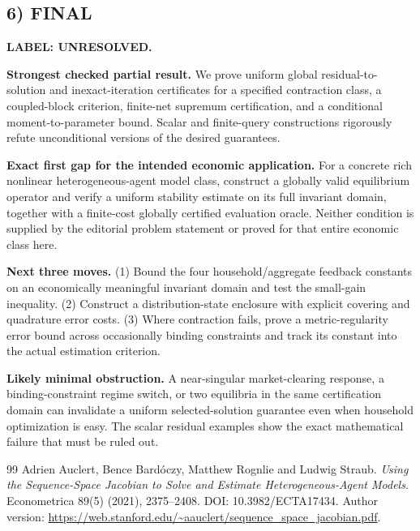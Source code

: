 \documentclass[11pt,a4paper]{article}
\theoremstyle{definition}
\newcommand{\unresolved}{\textbf{LABEL: UNRESOLVED.}}
\begin{document}
\subsection*{6) FINAL}
\unresolved

\textbf{Strongest checked partial result.} We prove uniform global residual-to-solution and inexact-iteration certificates for a specified contraction class, a coupled-block criterion, finite-net supremum certification, and a conditional moment-to-parameter bound. Scalar and finite-query constructions rigorously refute unconditional versions of the desired guarantees.

\textbf{Exact first gap for the intended economic application.} For a concrete rich nonlinear heterogeneous-agent model class, construct a globally valid equilibrium operator and verify a uniform stability estimate on its full invariant domain, together with a finite-cost globally certified evaluation oracle. Neither condition is supplied by the editorial problem statement or proved for that entire economic class here.

\textbf{Next three moves.} (1) Bound the four household/aggregate feedback constants on an economically meaningful invariant domain and test the small-gain inequality. (2) Construct a distribution-state enclosure with explicit covering and quadrature error costs. (3) Where contraction fails, prove a metric-regularity error bound across occasionally binding constraints and track its constant into the actual estimation criterion.

\textbf{Likely minimal obstruction.} A near-singular market-clearing response, a binding-constraint regime switch, or two equilibria in the same certification domain can invalidate a uniform selected-solution guarantee even when household optimization is easy. The scalar residual examples show the exact mathematical failure that must be ruled out.

\clearpage
\begin{thebibliography}{99}
Adrien Auclert, Bence Bard\'oczy, Matthew Rognlie and Ludwig Straub. \emph{Using the Sequence-Space Jacobian to Solve and Estimate Heterogeneous-Agent Models}. Econometrica 89(5) (2021), 2375--2408. DOI: 10.3982/ECTA17434. Author version: \url{https://web.stanford.edu/~aauclert/sequence_space_jacobian.pdf}.

\end{thebibliography}
\end{document}
